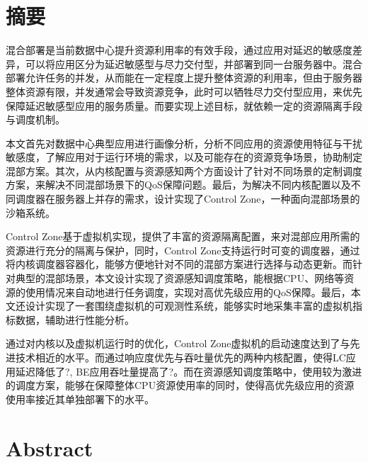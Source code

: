 
\maketitle%
\MAKETITLE%
\makedeclaration%
\intobmk\chapter*{摘\quad 要}%
\setcounter{page}{1}%


混合部署是当前数据中心提升资源利用率的有效手段，通过应用对延迟的敏感度差异，可以将应用区分为延迟敏感型与尽力交付型，并部署到同一台服务器中。混合部署允许任务的并发，从而能在一定程度上提升整体资源的利用率，但由于服务器整体资源有限，并发通常会导致资源竞争，此时可以牺牲尽力交付型应用，来优先保障延迟敏感型应用的服务质量。而要实现上述目标，就依赖一定的资源隔离手段与调度机制。

本文首先对数据中心典型应用进行画像分析，分析不同应用的资源使用特征与干扰敏感度，了解应用对于运行环境的需求，以及可能存在的资源竞争场景，协助制定混部方案。其次，从内核配置与资源感知两个方面设计了针对不同场景的定制调度方案，来解决不同混部场景下的QoS保障问题。最后，为解决不同内核配置以及不同调度器在服务器上并存的需求，设计实现了Control Zone，一种面向混部场景的沙箱系统。

Control Zone基于虚拟机实现，提供了丰富的资源隔离配置，来对混部应用所需的资源进行充分的隔离与保护，同时，Control Zone支持运行时可变的调度器，通过将内核调度器容器化，能够方便地针对不同的混部方案进行选择与动态更新。而针对典型的混部场景，本文设计实现了资源感知调度策略，能根据CPU、网络等资源的使用情况来自动地进行任务调度，实现对高优先级应用的QoS保障。最后，本文还设计实现了一套围绕虚拟机的可观测性系统，能够实时地采集丰富的虚拟机指标数据，辅助进行性能分析。


通过对内核以及虚拟机运行时的优化，Control Zone虚拟机的启动速度达到了与先进技术相近的水平。而通过响应度优先与吞吐量优先的两种内核配置，使得LC应用延迟降低了?, BE应用吞吐量提高了?。而在资源感知调度策略中，使用较为激进的调度方案，能够在保障整体CPU资源使用率的同时，使得高优先级应用的资源使用率接近其单独部署下的水平。


\intobmk\chapter*{Abstract}%



\KEYWORDS{}%

\pagestyle{enfrontmatterstyle}%
\cleardoublepage\pagestyle{frontmatterstyle}%

